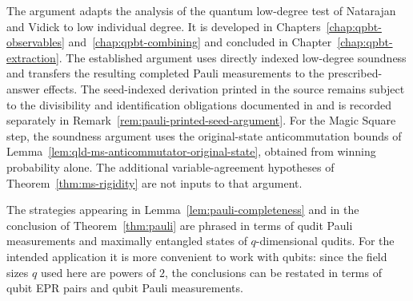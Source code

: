 The argument adapts the analysis of the quantum
low-degree test of Natarajan and Vidick to low individual degree. It is
developed in Chapters~\ref{chap:qpbt-observables}
and~\ref{chap:qpbt-combining} and concluded in
Chapter~\ref{chap:qpbt-extraction}. The established argument uses directly
indexed low-degree soundness and transfers the resulting completed Pauli
measurements to the prescribed-answer effects. The seed-indexed derivation
printed in the source remains subject to the divisibility and identification
obligations documented in \cite{gap:qpbt_ld-dimension-divisibility} and is
recorded separately in Remark~\ref{rem:pauli-printed-seed-argument}.
For the Magic Square step, the soundness argument uses the original-state
anticommutation bounds of
Lemma~\ref{lem:qld-ms-anticommutator-original-state}, obtained from winning
probability alone. The additional variable-agreement hypotheses of
Theorem~\ref{thm:ms-rigidity} are not inputs to that argument.

The strategies appearing in Lemma~\ref{lem:pauli-completeness} and in the conclusion of Theorem~\ref{thm:pauli} are phrased in terms of qudit Pauli measurements and maximally entangled states of $q$-dimensional qudits. For the intended application it is more convenient to work with qubits: since the field sizes $q$ used here are powers of $2$, the conclusions can be restated in terms of qubit EPR pairs and qubit Pauli measurements.

